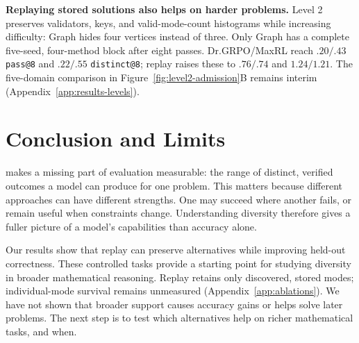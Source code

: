 \noindent\textbf{Replaying stored solutions also helps on harder problems.}
\label{sec:results-levels}
Level 2 preserves validators, keys, and valid-mode-count histograms while
increasing difficulty: Graph hides four vertices instead of three.
Only Graph has a complete five-seed, four-method block after eight passes.
Dr.GRPO/MaxRL reach $.20/.43$ \texttt{pass@8} and $.22/.55$
\texttt{distinct@8}; replay raises these to $.76/.74$ and $1.24/1.21$.
The five-domain comparison in Figure~\ref{fig:level2-admission}B remains interim
(Appendix~\ref{app:results-levels}).

\section{Conclusion and Limits}
\label{sec:conclusion}\label{sec:discussion}\label{sec:limitations}
\mb{} makes a missing part of evaluation measurable: the range of distinct,
verified outcomes a model can produce for one problem. This matters because
different approaches can have different strengths. One may succeed where
another fails, or remain useful when constraints change. Understanding diversity
therefore gives a fuller picture of a model's capabilities than accuracy alone.

Our results show that replay can preserve alternatives while improving
held-out correctness. These controlled tasks provide a starting point for
studying diversity in broader mathematical reasoning. Replay retains only discovered,
stored modes; individual-mode survival remains unmeasured
(Appendix~\ref{app:ablations}). We have not shown that broader support causes
accuracy gains or helps solve later problems. The next step is to test which
alternatives help on richer mathematical tasks, and when.

\label{main:lastpage}
\clearpage


\clearpage
\appendix


